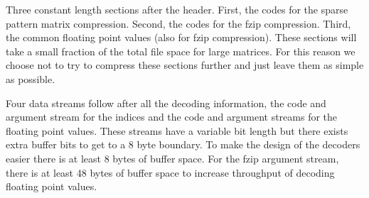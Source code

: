 Three constant length sections after the header. First, the codes for the sparse pattern matrix compression. Second, the codes for the fzip compression. Third, the common floating point values (also for fzip compression). These sections will take a small fraction of the total file space for large matrices. For this reason we choose not to try to compress these sections further and just leave them as simple as possible.

Four data streams follow after all the decoding information, the code and argument stream for the indices and the code and argument streams for the floating point values. These streams have a variable bit length but there exists extra buffer bits to get to a 8 byte boundary. To make the design of the decoders easier there is at least 8 bytes of buffer space. For the fzip argument stream, there is at least 48 bytes of buffer space to increase throughput of decoding floating point values.

